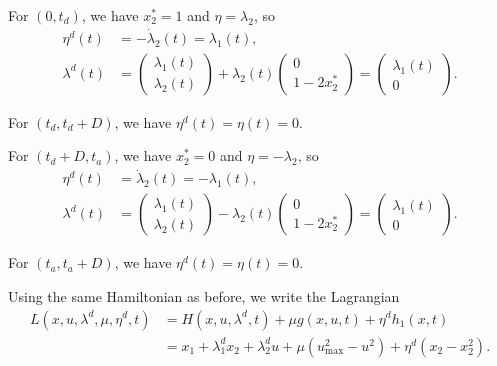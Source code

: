 \documentclass[a4paper]{article}
\theoremstyle{definition}
\theoremstyle{plain}
\begin{document}
For $(0, t_{d})$, we have $x_{2}^{*} = 1$ and $\eta = \lambda_{2}$, so
\begin{align*}
  \eta^{d}(t) &= -\dot{\lambda}_{2}(t) = \lambda_{1}(t) , \\
  \lambda^{d}(t) &= \begin{pmatrix} \lambda_{1}(t) \\ \lambda_{2}(t) \end{pmatrix} + \lambda_{2}(t) \begin{pmatrix} 0 \\ 1 - 2 x_{2}^{*} \end{pmatrix}
  = \begin{pmatrix} \lambda_{1}(t) \\ 0  \end{pmatrix} .
\end{align*}

For $(t_{d}, t_{d} + D)$, we have $\eta^{d}(t) = \eta(t) = 0$.

For $(t_{d} + D, t_{a})$, we have $x_{2}^{*} = 0$ and $\eta = - \lambda_{2}$, so
\begin{align*}
  \eta^{d}(t) &= \dot{\lambda}_{2}(t) = -\lambda_{1}(t) , \\
  \lambda^{d}(t) &= \begin{pmatrix} \lambda_{1}(t) \\ \lambda_{2}(t) \end{pmatrix} - \lambda_{2}(t) \begin{pmatrix} 0 \\ 1 - 2 x_{2}^{*} \end{pmatrix} = \begin{pmatrix} \lambda_{1}(t) \\ 0 \end{pmatrix} .
\end{align*}

For $(t_{a}, t_{a} + D)$, we have $\eta^{d}(t) = \eta(t) = 0$.

Using the same Hamiltonian as before,
we write the Lagrangian
\begin{align*}
  L(x, u, \lambda^{d}, \mu, \eta^{d}, t) &= H(x, u, \lambda^{d}, t) + \mu g(x,u,t) + \eta^{d} h_{1}(x, t) \\
  &= x_{1} + \lambda^{d}_{1}x_{2} + \lambda^{d}_{2}u + \mu (u_{\max}^{2} - u^{2}) + \eta^{d} (x_{2} - x_{2}^{2}) .
\end{align*}
\end{document}

